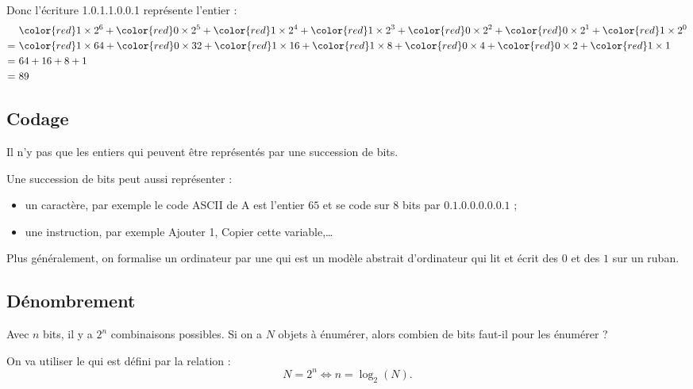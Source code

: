 \documentclass[11pt,class=report,crop=false]{standalone}
\begin{document}
    Donc l'écriture {\color{red}1}.{\color{red}0}.{\color{red}1}.{\color{red}1}.{\color{red}0}.{\color{red}0}.{\color{red}1} représente l'entier : 
    \begin{align*}
    & {\color{red}1} \times 2^6  + {\color{red}0} \times 2^5 + {\color{red}1} \times 2^4  + {\color{red}1} \times 2^3 + {\color{red}0} \times 2^2 + {\color{red}0} \times 2^1 + {\color{red}1} \times 2^0 \\    
    =\ & {\color{red}1} \times 64  + {\color{red}0} \times 32 + {\color{red}1} \times 16  + {\color{red}1} \times 8 + {\color{red}0} \times 4 + {\color{red}0} \times 2 + {\color{red}1} \times 1 \\
    =\ & 64 + 16 + 8 + 1 \\
    =\ & 89
    \end{align*}
    
\subsection{Codage}

Il n'y pas que les entiers qui peuvent être représentés par une succession de bits.

Une succession de bits peut aussi représenter :
\begin{itemize}
  \item un caractère, par exemple le code ASCII de \og{}A\fg{} est l'entier $65$ et se code sur $8$ bits par $0.1.0.0.0.0.0.1$ ;
  
  \item une instruction, par exemple \og{}Ajouter 1\fg{}, \og{}Copier cette variable\fg{},\ldots
\end{itemize}

Plus généralement, on formalise un ordinateur par une  qui est un modèle abstrait d'ordinateur qui lit et écrit des $0$ et des $1$ sur un ruban.

\subsection{Dénombrement}


Avec $n$ bits, il y a $2^n$ combinaisons possibles.
Si on a $N$ objets à énumérer, alors combien de bits faut-il pour les énumérer ?

On va utiliser le  qui est défini par la relation :
$$N = 2^n \iff n = \log_2(N).$$
\end{document}
